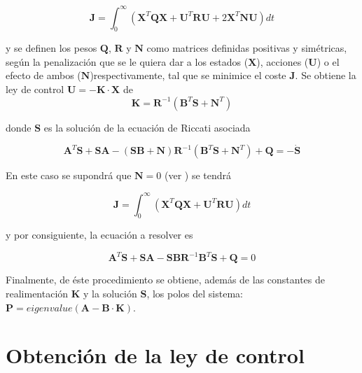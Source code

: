 \documentclass[twoside,11pt]{report}
\begin{document}
\begin{equation}
\mathbf{J} =\int^{\infty}_{0} \left( \mathbf{X}^{T} \mathbf{Q}\pmb{X} + \mathbf{U}^{T} \mathbf{R}\mathbf{U} + 2\mathbf{X}^{T} \mathbf{N}\mathbf{U} \right) dt
\end{equation}

y se definen los pesos $\mathbf{Q}$, $\mathbf{R}$ y $\mathbf{N}$ como matrices definidas positivas y simétricas, según la penalización que se le quiera dar a los estados ($\mathbf{X}$), acciones ($\mathbf{U}$) o el efecto de ambos ($\mathbf{N}$)respectivamente, tal que se minimice el coste $\mathbf{J}$. Se obtiene la ley de control $\mathbf{U}=-\mathbf{K} \cdot \mathbf{X}$ de 
\begin{equation}
\mathbf{K}=\mathbf{R}^{-1} \left( \mathbf{B}^{T} \mathbf{S} + \mathbf{N}^{T} \right) 
\end{equation}

donde $\mathbf{S}$ es la solución de la ecuación de Riccati asociada 

\begin{equation}
\mathbf{A}^{T}\mathbf{S} + \mathbf{S}\mathbf{A} - \left( \mathbf{S}\pmb{B}+\mathbf{N} \right) \mathbf{R}^{-1} \left( \mathbf{B}^{T} \mathbf{S} + \mathbf{N}^{T} \right) + \mathbf{Q} = - \dot{\mathbf{S}}
\end{equation}

En este caso se supondrá que $\mathbf{N}=0$ (ver \cite{LQR_Matlab}) se tendrá

\begin{equation}
\mathbf{J} =\int^{\infty}_{0} \left( \mathbf{X}^{T} \mathbf{Q}\mathbf{X} + \mathbf{U}^{T}\mathbf{R}\mathbf{U} \right) dt
\end{equation}

y por consiguiente, la ecuación a resolver es

\begin{equation}
\mathbf{A}^{T}\mathbf{S} + \mathbf{S}\mathbf{A} - \mathbf{S}\mathbf{B} \mathbf{R}^{-1} \mathbf{B}^{T} \mathbf{S} + \mathbf{Q} = 0
\end{equation}

Finalmente, de éste procedimiento se obtiene, además de las constantes de realimentación $\mathbf{K}$ y la solución $\mathbf{S}$, los polos del sistema: $\mathbf{P}=eigenvalue( \mathbf{A} - \mathbf{B} \cdot \mathbf{K})$.


\section{Obtención de la ley de control}
\end{document}
